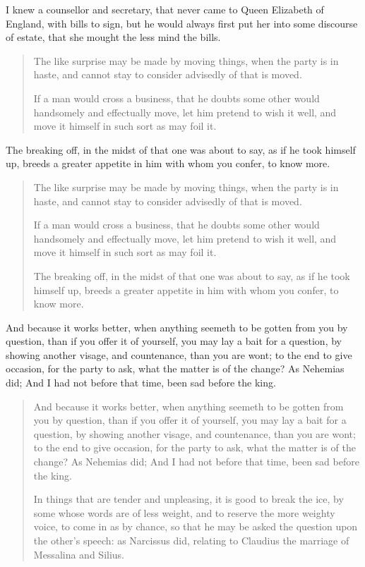 \documentclass[a4paper, 12pt]{memoir}
\begin{document}
I knew a counsellor and secretary, that never came to Queen Elizabeth of England, with bills to sign, but he would always first put her into some discourse of estate, that she mought the less mind the bills. 

\begin{quote} 
 The like surprise may be made by moving things, when the party is in haste, and cannot stay to consider advisedly of that is moved.

If a man would cross a business, that he doubts some other would handsomely and effectually move, let him pretend to wish it well, and move it himself in such sort as may foil it.
 \end{quote}

The breaking off, in the midst of that one was about to say, as if he took himself up, breeds a greater appetite in him with whom you confer, to know more. 

\begin{quotation}
 The like surprise may be made by moving things, when the party is in haste, and cannot stay to consider advisedly of that is moved.

If a man would cross a business, that he doubts some other would handsomely and effectually move, let him pretend to wish it well, and move it himself in such sort as may foil it.

The breaking off, in the midst of that one was about to say, as if he took himself up, breeds a greater appetite in him with whom you confer, to know more. 
 \end{quotation}

 And because it works better, when anything seemeth to be gotten from you by question, than if you offer it of yourself, you may lay a bait for a question, by showing another visage, and countenance, than you are wont; to the end to give occasion, for the party to ask, what the matter is of the change? As Nehemias did; And I had not before that time, been sad before the king. 

\begin{quotation}
 And because it works better, when anything seemeth to be gotten from you by question, than if you offer it of yourself, you may lay a bait for a question, by showing another visage, and countenance, than you are wont; to the end to give occasion, for the party to ask, what the matter is of the change? As Nehemias did; And I had not before that time, been sad before the king.

In things that are tender and unpleasing, it is good to break the ice, by some whose words are of less weight, and to reserve the more weighty voice, to come in as by chance, so that he may be asked the question upon the other's speech: as Narcissus did, relating to Claudius the marriage of Messalina and Silius.

 \end{quotation}
\end{document}
